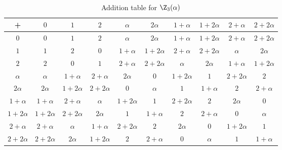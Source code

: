 \begin{solution}[(ii)] $ $

  \begin{table}[H]
    \begin{center}
      \begin{tabular}{c||ccccccccc}
        + & $0$ & $1$ & $2$ & $\alpha$ & $2\alpha$ & $1+\alpha$ & $1+2\alpha$ & $2+\alpha$ & $2+2\alpha$\\
        \hline\hline
        $0$ & $0$ & $1$ & $2$ & $\alpha$ & $2\alpha$ & $1+\alpha$ & $1+2\alpha$ & $2+\alpha$ & $2+2\alpha$ \\
        \hline
        $1$ & $1$ & $2$ & $0$ & $1+\alpha$ & $1+2\alpha$ & $2+\alpha$ & $2+2\alpha$ & $\alpha$ & $2\alpha$ \\
        \hline
        $2$ & $2$ & $0$ & $1$ & $2+\alpha$ & $2+2\alpha$ & $\alpha$ & $2\alpha$ & $1+\alpha$ & $1+2\alpha$ \\
        \hline
        $\alpha$ & $\alpha$ & $1+\alpha$ & $2+\alpha$ & $2\alpha$ & $0$ & $1+2\alpha$ & $1$ & $2+2\alpha$ & $2$ \\
        \hline
        $2\alpha$ & $2\alpha$ & $1+2\alpha$ & $2+2\alpha$ & $0$ & $\alpha$ & $1$ & $1+\alpha$ & $2$ & $2+\alpha$ \\  
        \hline 
        $1+\alpha$ & $1+\alpha$ & $2+\alpha$ & $\alpha$ & $1+2\alpha$ & $1$ & $2+2\alpha$ & $2$ & $2\alpha$ & $0$ \\ 
        \hline 
        $1+2\alpha$ & $1+2\alpha$ & $2+2\alpha$ & $2\alpha$ & $1$ & $1+\alpha$ & $2$ & $2+\alpha$ & $0$ & $\alpha$ \\  
        \hline 
        $2+\alpha$ & $2+\alpha$ & $\alpha$ & $1+\alpha$ & $2+2\alpha$ & $2$ & $2\alpha$ & $0$ & $1+2\alpha$ & $1$ \\ 
        \hline
        $2+2\alpha$ & $2+2\alpha$ & $2\alpha$ & $1+2\alpha$ & $2$ & $2+\alpha$ & $0$ & $\alpha$ & $1$ & $1+\alpha$ 
      \end{tabular}
      \caption{Addition table for $\Z_3(\alpha)$}
    \end{center}
  \end{table}


\end{solution}
